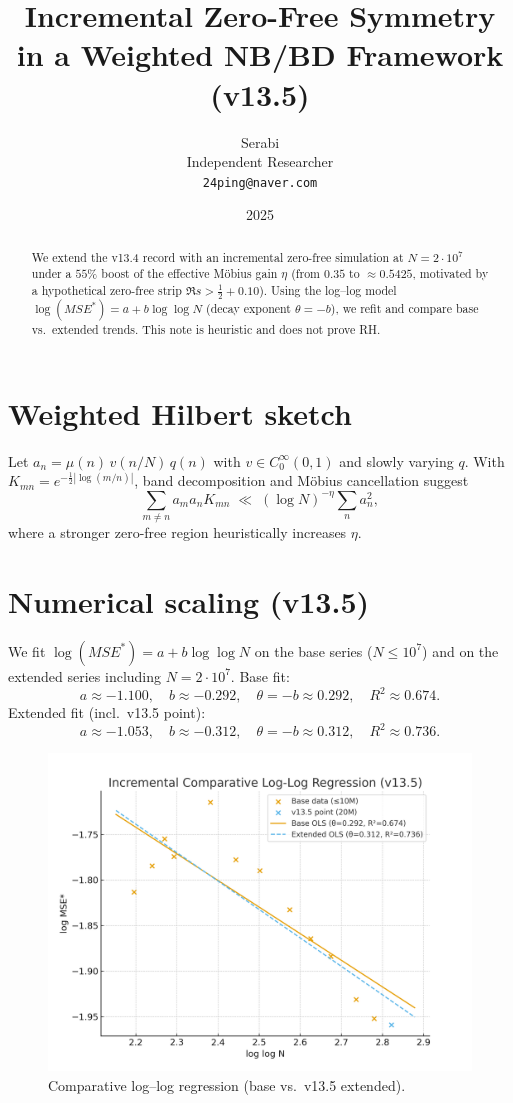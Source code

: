 \documentclass[11pt]{article}
\title{Incremental Zero-Free Symmetry in a Weighted NB/BD Framework (v13.5)}
\author{Serabi \\ Independent Researcher \\ \texttt{24ping@naver.com}}
\date{2025}
\theoremstyle{remark}
\begin{document}
\maketitle

\begin{abstract}
We extend the v13.4 record with an incremental zero-free simulation at $N=2\cdot 10^7$ under a $55\%$ boost of the effective Möbius gain $\eta$ (from $0.35$ to $\approx 0.5425$, motivated by a hypothetical zero-free strip $\Re s>\tfrac12+0.10$).
Using the log--log model $\log(MSE^\ast)=a+b\log\log N$ (decay exponent $\theta=-b$), we refit and compare base vs.\ extended trends.
This note is heuristic and does not prove RH.
\end{abstract}

\section{Weighted Hilbert sketch}
Let $a_n=\mu(n)\,v(n/N)\,q(n)$ with $v\in C_0^\infty(0,1)$ and slowly varying $q$.
With $K_{mn}=e^{-\tfrac12|\log(m/n)|}$, band decomposition and Möbius cancellation suggest
\[
\sum_{m\ne n}a_m a_n K_{mn}\;\ll\; (\log N)^{-\eta}\sum_n a_n^2,
\]
where a stronger zero-free region heuristically increases $\eta$.

\section{Numerical scaling (v13.5)}
We fit $\log(MSE^\ast)=a+b\log\log N$ on the base series ($N\le 10^7$) and on the extended series including $N=2\cdot 10^7$.
Base fit:
\[
a\approx -1.100,\quad b\approx -0.292,\quad \theta=-b\approx 0.292,\quad R^2\approx 0.674.
\]
Extended fit (incl.\ v13.5 point):
\[
a\approx -1.053,\quad b\approx -0.312,\quad \theta=-b\approx 0.312,\quad R^2\approx 0.736.
\]

\begin{figure}[h]
\centering
\includegraphics[width=0.8\linewidth]{figure3.png}
\caption{Comparative log--log regression (base vs.\ v13.5 extended).}
\end{figure}
\end{document}
